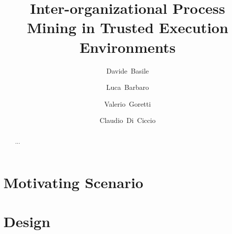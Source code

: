 \documentclass[runningheads]{llncs}
\begin{document}
%
\title{
}
%
%
\author{Davide~Basile \and
Luca~Barbaro \and
Valerio~Goretti \and Claudio~Di~Ciccio}
%
%
%
\title{Inter-organizational Process Mining in Trusted Execution Environments}
\maketitle

\begin{abstract}
...
\end{abstract}





\section{Motivating Scenario}\label{sec:motivating}

\section{Design}\label{sec:design}







\end{document}
